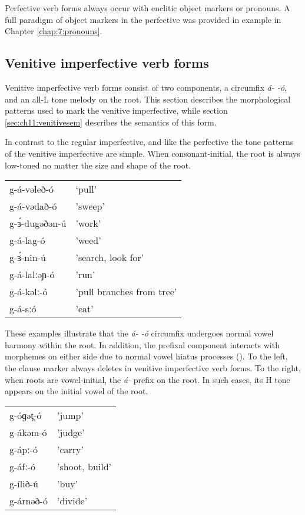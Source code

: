 Perfective verb forms always occur with enclitic object markers or pronouns. A full paradigm of object markers in the perfective was provided in example  in Chapter \ref{chap:7:pronouns}.
 
 
\subsection{Venitive imperfective verb forms}\label{sec:ch11:venitive}

Venitive imperfective verb forms consist of two components, a circumfix \textit{á- -ó}, and an all-L tone melody on the root. This section describes the morphological patterns used to mark the venitive imperfective, while section \ref{sec:ch11:venitivesem} describes the semantics of this form.

In contrast to the regular imperfective, and like the perfective the tone patterns of the venitive imperfective are simple. When consonant-initial, the root is always low-toned no matter the size and shape of the root.

\ea 
\begin{tabular}[t]{ll}
g-á-vəleð-ó		&	‘pull’\\
g-á-vədað-ó		&	'sweep'\\
g-ɜ́-dugəðən-ú	&	'work'\\
g-á-lag-ó		&	'weed'\\
g-ɜ́-nin-ú		&	'search, look for'\\
g-á-lalːəɲ-ó	&	'run'\\
g-á-kəlː-ó		&	'pull branches from tree'\\
g-á-sːó			&	'eat'\\ 
\end{tabular}
\z 
These examples illustrate that the \textit{á- -ó} circumfix undergoes normal vowel harmony within the root. In addition, the prefixal component interacts with morphemes on either side due to normal vowel hiatus processes (). To the left, the clause marker always deletes in venitive imperfective verb forms. %
To the right, when roots are vowel-initial, the \textit{á-} prefix on the root. In such cases, its H tone appears on the initial vowel of the root.

\ea 
\begin{tabular}[t]{ll}
g-óɡət̪-ó	&	'jump'\\
g-ákəm-ó	&	'judge'\\
g-ápː-ó		&	'carry'\\
g-áfː-ó		&	'shoot, build'\\
g-ílið-ú	&	'buy'\\
g-árnəð-ó	&	'divide'\\ 	
\end{tabular}
\z 

